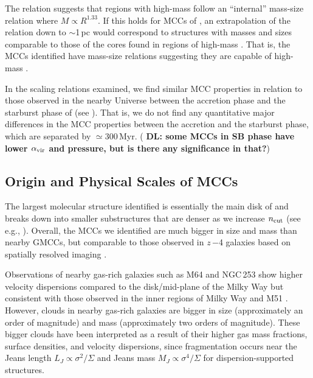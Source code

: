 \IfFileExists{emulateapjlegacy.cls}{\documentclass[iop]{emulateapjlegacy}}{\documentclass[iop]{emulateapj}}
\newcommand{\DL}[1]{({\bf \color{dlcolor} DL: #1})}
\begin{document}
The \citet{Kauffmann10c} relation suggests that regions with high-mass \SF follow 
an ``internal'' mass-size relation where $M\propto R^{1.33}$.
If this holds for MCCs of \flower, an extrapolation of the \citet{Kauffmann10c} relation down to $\sim$1\,pc would correspond to structures with masses and sizes comparable to those of the cores found in
regions of high-mass \SF. That is, the MCCs identified have mass-size relations suggesting they are capable of high-mass \SF. 

In the scaling relations examined, we find similar MCC properties in relation to those observed in the nearby Universe between the accretion phase and the starburst phase of \flower (see ). That is, we do not find any quantitative major differences in the MCC properties between the accretion and the starburst phase, which are separated by $\simeq$300\,Myr. \DL{some MCCs in SB phase have
lower $\alpha_{\rm vir}$ and pressure, but 
is there any significance in that?}

\subsection{Origin and Physical Scales of MCCs} \label{sec:origin}

The largest molecular structure identified is essentially the main disk of \flower and breaks down into smaller substructures that are denser as we increase $n_{\rm cut}$ (see e.g., ). Overall, the MCCs we identified are much bigger in size and mass than nearby GMCCs, but comparable to those observed in $z$\,$-$4 galaxies based on spatially resolved imaging \citep{Swinbank11a}.

Observations of nearby gas-rich galaxies such as M64 and NGC\,253 show higher velocity dispersions compared to the disk/mid-plane of the Milky Way but consistent with those observed in the inner regions of Milky Way and M51 \citep{Oka01a, Rosolowsky05a, Heyer09a, Hughes13b, Leroy15a, Rice16a}.  %
However, clouds in nearby gas-rich galaxies are bigger in size (approximately an order of magnitude) and mass (approximately two orders of magnitude).
These bigger clouds have been interpreted as a result of their higher gas mass fractions, surface densities, and velocity dispersions,
since fragmentation occurs near the Jeans length $L_J\propto\sigma^2/\Sigma$ and
Jeans mass $M_J\propto\sigma^4/\Sigma$ for dispersion-supported structures.
\end{document}
